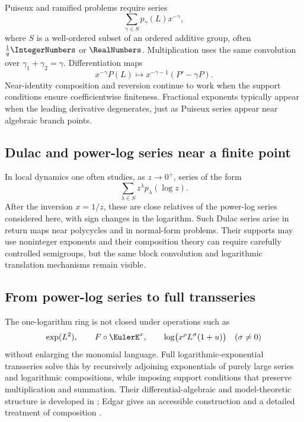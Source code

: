 \documentclass[11pt]{article}
\theoremstyle{pltheorem}
\newcommand{\compose}{\mathbin{\circ}}
\begin{document}
Puiseux and ramified problems require series
\begin{equation}\label{eq:generalized-exponent-series}
 \sum_{\gamma\in S}p_\gamma(L)x^{-\gamma},
\end{equation}
where \(S\) is a well-ordered subset of an ordered additive group, often
\(\frac1q\IntegerNumbers\) or \(\RealNumbers\).  Multiplication uses the same convolution over
\(\gamma_1+\gamma_2=\gamma\).  Differentiation maps
\[
 x^{-\gamma}P(L)
 \longmapsto x^{-\gamma-1}(P'-\gamma P).
\]
Near-identity composition and reversion continue to work when the support conditions ensure coefficientwise finiteness.  Fractional exponents typically appear when the leading derivative degenerates, just as Puiseux series appear near algebraic branch points.

\subsection{Dulac and power-log series near a finite point}

In local dynamics one often studies, as \(z\to0^+\), series of the form
\begin{equation}\label{eq:Dulac-form}
 \sum_{\lambda\in S}z^\lambda p_\lambda(\log z).
\end{equation}
After the inversion \(x=1/z\), these are close relatives of the power-log series considered here, with sign changes in the logarithm.  Such Dulac series arise in return maps near polycycles and in normal-form problems.  Their supports may use noninteger exponents and their composition theory can require carefully controlled semigroups, but the same block convolution and logarithmic translation mechanisms remain visible.

\subsection{From power-log series to full transseries}

The one-logarithm ring is not closed under operations such as
\[
 \exp(L^2),
 \qquad
 F\compose\EulerE^x,
 \qquad
 \log\bigl(x^\rho L^\sigma(1+u)\bigr)
 \quad(\sigma\ne0)
\]
without enlarging the monomial language.  Full logarithmic-exponential transseries solve this by recursively adjoining exponentials of purely large series and logarithmic compositions, while imposing support conditions that preserve multiplication and summation.  Their differential-algebraic and model-theoretic structure is developed in
\cite{vanderhoeven-book,adh-book}; Edgar gives an accessible construction and a detailed treatment of composition \cite{edgar-beginners,edgar-composition}.
\end{document}

